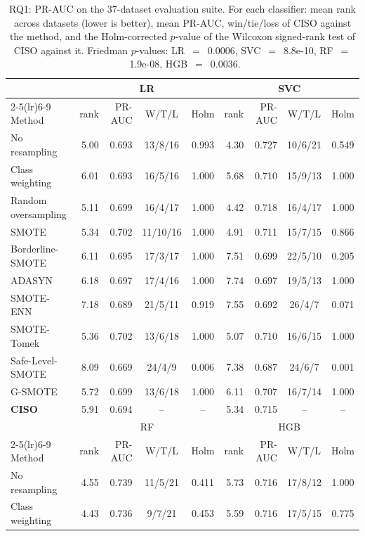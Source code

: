 \begin{table}[t]\centering
\caption{RQ1: PR-AUC on the 37-dataset evaluation suite. For each classifier: mean rank across datasets (lower is better), mean PR-AUC, win/tie/loss of CISO against the method, and the Holm-corrected $p$-value of the Wilcoxon signed-rank test of CISO against it. Friedman $p$-values: LR~$=$~0.0006, SVC~$=$~8.8e-10, RF~$=$~1.9e-08, HGB~$=$~0.0036.}
\label{tab:rq1}\footnotesize\setlength{\tabcolsep}{3.5pt}
\begin{tabular}{@{}lrrcc rrcc@{}}\toprule
 & \multicolumn{4}{c}{LR} & \multicolumn{4}{c}{SVC}\\
\cmidrule(lr){2-5}\cmidrule(lr){6-9}
Method & rank & PR-AUC & W/T/L & Holm & rank & PR-AUC & W/T/L & Holm\\\midrule
No resampling & 5.00 & 0.693 & 13/8/16 & 0.993 & 4.30 & 0.727 & 10/6/21 & 0.549 \\
Class weighting & 6.01 & 0.693 & 16/5/16 & 1.000 & 5.68 & 0.710 & 15/9/13 & 1.000 \\
Random oversampling & 5.11 & 0.699 & 16/4/17 & 1.000 & 4.42 & 0.718 & 16/4/17 & 1.000 \\
SMOTE & 5.34 & 0.702 & 11/10/16 & 1.000 & 4.91 & 0.711 & 15/7/15 & 0.866 \\
Borderline-SMOTE & 6.11 & 0.695 & 17/3/17 & 1.000 & 7.51 & 0.699 & 22/5/10 & 0.205 \\
ADASYN & 6.18 & 0.697 & 17/4/16 & 1.000 & 7.74 & 0.697 & 19/5/13 & 1.000 \\
SMOTE-ENN & 7.18 & 0.689 & 21/5/11 & 0.919 & 7.55 & 0.692 & 26/4/7 & 0.071 \\
SMOTE-Tomek & 5.36 & 0.702 & 13/6/18 & 1.000 & 5.07 & 0.710 & 16/6/15 & 1.000 \\
Safe-Level-SMOTE & 8.09 & 0.669 & 24/4/9 & 0.006 & 7.38 & 0.687 & 24/6/7 & 0.001 \\
G-SMOTE & 5.72 & 0.699 & 13/6/18 & 1.000 & 6.11 & 0.707 & 16/7/14 & 1.000 \\
\textbf{CISO} & 5.91 & 0.694 & -- & -- & 5.34 & 0.715 & -- & -- \\
\midrule
 & \multicolumn{4}{c}{RF} & \multicolumn{4}{c}{HGB}\\
\cmidrule(lr){2-5}\cmidrule(lr){6-9}
Method & rank & PR-AUC & W/T/L & Holm & rank & PR-AUC & W/T/L & Holm\\\midrule
No resampling & 4.55 & 0.739 & 11/5/21 & 0.411 & 5.73 & 0.716 & 17/8/12 & 1.000 \\
Class weighting & 4.43 & 0.736 & 9/7/21 & 0.453 & 5.59 & 0.716 & 17/5/15 & 0.775 \\

\end{tabular}
\end{table}
